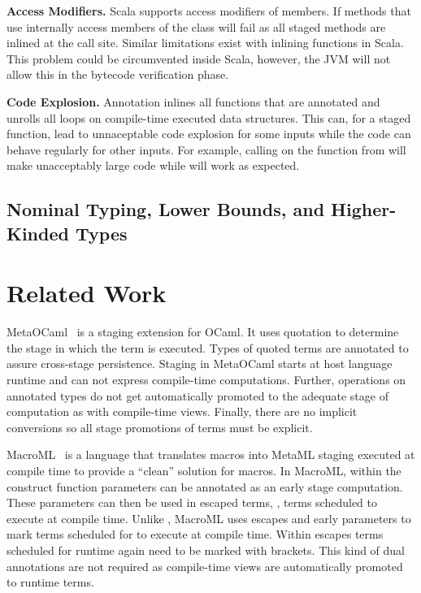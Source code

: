 {\bf Access Modifiers.} Scala supports access modifiers of members. If methods that use \ct internally access  members of the class \ct will fail as all staged methods are inlined at the call site. Similar limitations exist with inlining functions in Scala. This problem could be circumvented inside Scala, however, the JVM will not allow this in the bytecode verification phase.

{\bf Code Explosion.} Annotation  inlines all functions that are annotated and unrolls all loops on compile-time executed data structures. This can, for a staged function, lead to unnaceptable code explosion for some inputs while the code can behave regularly for other inputs. For example, calling  on the function from  will make unacceptably large code while  will work as expected.

\subsection{Nominal Typing, Lower Bounds, and Higher-Kinded Types}
\label{sct:nominal-typing}


\section{Related Work}
\label{sec:related-work-staging}

MetaOCaml~\cite{taha_multi-stage_1997,calcagno2003implementing} is a staging extension
 for OCaml. It uses quotation to determine the stage in which the term is executed. Types of quoted terms are annotated
 to assure cross-stage persistence. Staging in MetaOCaml starts at host language runtime and
 can not express compile-time computations. Further, operations on annotated types
 do not get automatically promoted to the adequate stage of computation as with compile-time views.
 Finally, there are no implicit conversions so all stage promotions of terms must be explicit.

MacroML~\cite{ganz2001macros} is a language that translates macros into MetaML staging executed
 at compile time to provide a ``clean'' solution for macros. In MacroML, within
 the  construct function parameters can be annotated as an early stage computation. These parameters
 can then be used in escaped terms, \ie, terms scheduled to execute at compile time. Unlike \ct, MacroML
 uses escapes and early parameters to mark terms scheduled for to execute at compile time. Within
 escapes terms scheduled for runtime again need to be marked with brackets. This kind of dual annotations are
 not required as compile-time views are automatically promoted to runtime terms.

